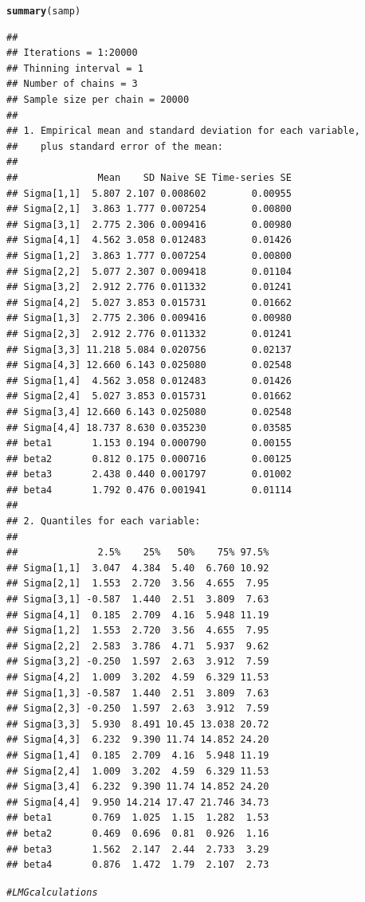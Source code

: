 \documentclass[11pt,a4paper,twoside]{book}\usepackage[]{graphicx}\usepackage[]{color}
\makeatletter
\newcommand{\hlcom}[1]{\textcolor[rgb]{0.678,0.584,0.686}{\textit{#1}}}%
\newcommand{\hlstd}[1]{\textcolor[rgb]{0.345,0.345,0.345}{#1}}%
\newcommand{\hlkwd}[1]{\textcolor[rgb]{0.737,0.353,0.396}{\textbf{#1}}}%
\newenvironment{kframe}{%
 \def\at@end@of@kframe{}%
 \ifinner\ifhmode%
  \def\at@end@of@kframe{\end{minipage}}%
  \begin{minipage}{\columnwidth}%
 \fi\fi%
 \def\FrameCommand##1{\hskip\@totalleftmargin \hskip-\fboxsep
 \colorbox{shadecolor}{##1}\hskip-\fboxsep
     \hskip-\linewidth \hskip-\@totalleftmargin \hskip\columnwidth}%
 \MakeFramed {\advance\hsize-\width
   \@totalleftmargin\z@ \linewidth\hsize
   \@setminipage}}%
 {\par\unskip\endMakeFramed%
 \at@end@of@kframe}
\newenvironment{knitrout}{}{} %
\makeatother
\begin{document}
\begin{knitrout}
\begin{kframe}
\begin{alltt}
\hlkwd{summary}\hlstd{(samp)}
\end{alltt}
\begin{verbatim}
## 
## Iterations = 1:20000
## Thinning interval = 1 
## Number of chains = 3 
## Sample size per chain = 20000 
## 
## 1. Empirical mean and standard deviation for each variable,
##    plus standard error of the mean:
## 
##              Mean    SD Naive SE Time-series SE
## Sigma[1,1]  5.807 2.107 0.008602        0.00955
## Sigma[2,1]  3.863 1.777 0.007254        0.00800
## Sigma[3,1]  2.775 2.306 0.009416        0.00980
## Sigma[4,1]  4.562 3.058 0.012483        0.01426
## Sigma[1,2]  3.863 1.777 0.007254        0.00800
## Sigma[2,2]  5.077 2.307 0.009418        0.01104
## Sigma[3,2]  2.912 2.776 0.011332        0.01241
## Sigma[4,2]  5.027 3.853 0.015731        0.01662
## Sigma[1,3]  2.775 2.306 0.009416        0.00980
## Sigma[2,3]  2.912 2.776 0.011332        0.01241
## Sigma[3,3] 11.218 5.084 0.020756        0.02137
## Sigma[4,3] 12.660 6.143 0.025080        0.02548
## Sigma[1,4]  4.562 3.058 0.012483        0.01426
## Sigma[2,4]  5.027 3.853 0.015731        0.01662
## Sigma[3,4] 12.660 6.143 0.025080        0.02548
## Sigma[4,4] 18.737 8.630 0.035230        0.03585
## beta1       1.153 0.194 0.000790        0.00155
## beta2       0.812 0.175 0.000716        0.00125
## beta3       2.438 0.440 0.001797        0.01002
## beta4       1.792 0.476 0.001941        0.01114
## 
## 2. Quantiles for each variable:
## 
##              2.5%    25%   50%    75% 97.5%
## Sigma[1,1]  3.047  4.384  5.40  6.760 10.92
## Sigma[2,1]  1.553  2.720  3.56  4.655  7.95
## Sigma[3,1] -0.587  1.440  2.51  3.809  7.63
## Sigma[4,1]  0.185  2.709  4.16  5.948 11.19
## Sigma[1,2]  1.553  2.720  3.56  4.655  7.95
## Sigma[2,2]  2.583  3.786  4.71  5.937  9.62
## Sigma[3,2] -0.250  1.597  2.63  3.912  7.59
## Sigma[4,2]  1.009  3.202  4.59  6.329 11.53
## Sigma[1,3] -0.587  1.440  2.51  3.809  7.63
## Sigma[2,3] -0.250  1.597  2.63  3.912  7.59
## Sigma[3,3]  5.930  8.491 10.45 13.038 20.72
## Sigma[4,3]  6.232  9.390 11.74 14.852 24.20
## Sigma[1,4]  0.185  2.709  4.16  5.948 11.19
## Sigma[2,4]  1.009  3.202  4.59  6.329 11.53
## Sigma[3,4]  6.232  9.390 11.74 14.852 24.20
## Sigma[4,4]  9.950 14.214 17.47 21.746 34.73
## beta1       0.769  1.025  1.15  1.282  1.53
## beta2       0.469  0.696  0.81  0.926  1.16
## beta3       1.562  2.147  2.44  2.733  3.29
## beta4       0.876  1.472  1.79  2.107  2.73
\end{verbatim}
\begin{alltt}
\hlcom{#LMG calculations}


\end{alltt}
\end{kframe}
\end{knitrout}
\end{document}
